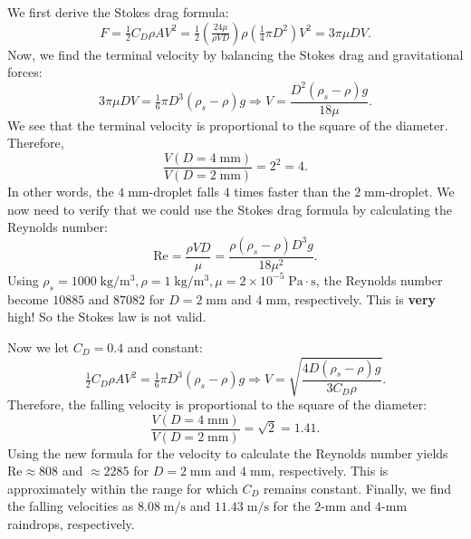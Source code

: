 \documentclass[12pt]{article}
\begin{document}
\begin{ex}
\begin{solution}
  We first derive the Stokes drag formula:
  \begin{equation*}
    F=\tfrac{1}{2}C_D\rho A V^2=\tfrac{1}{2}\left(\tfrac{24\mu}{\rho V D}\right)\rho \left(\tfrac{1}{4}\pi D^2\right) V^2=3\pi\mu DV.
  \end{equation*}
  Now, we find the terminal velocity by balancing the Stokes drag and gravitational forces:
  \begin{equation*}
    3\pi\mu DV=\tfrac{1}{6}\pi D^3(\rho_s-\rho)g\Rightarrow V=\frac{D^2(\rho_s-\rho)g}{18\mu}.
  \end{equation*}
  We see that the terminal velocity is proportional to the square of the diameter. Therefore,
  \begin{equation*}
    \frac{V(D=4\;\mathrm{mm})}{V(D=2\;\mathrm{mm})}=2^2=4.
  \end{equation*}
  In other words, the $4\;\mathrm{mm}$-droplet falls $4$ times faster than the $2\;\mathrm{mm}$-droplet. We now need to verify that we could use the Stokes drag formula by calculating the Reynolds number:
  \begin{equation*}
    \mathrm{Re}=\frac{\rho VD}{\mu}=\frac{\rho(\rho_s-\rho)D^3 g}{18\mu^2}.
  \end{equation*}
  Using $\rho_s=1000\;\mathrm{kg/m^3},\rho=1\;\mathrm{kg/m^3},\mu=2\times 10^{-5}\;\mathrm{Pa\cdot s}$, the Reynolds number become $10885$ and $87082$ for $D=2\;\mathrm{mm}$ and $4\;\mathrm{mm}$, respectively. This is \textbf{very} high! So the Stokes law is not valid.

  Now we let $C_D=0.4$ and constant:
  \begin{equation*}
    \tfrac{1}{2}C_D\rho AV^2=\tfrac{1}{6}\pi D^3(\rho_s-\rho)g\Rightarrow V=\sqrt{\frac{4D(\rho_s-\rho)g}{3C_D\rho}}.
  \end{equation*}
  Therefore, the falling velocity is proportional to the square of the diameter:
\begin{equation*}
    \frac{V(D=4\;\mathrm{mm})}{V(D=2\;\mathrm{mm})}=\sqrt{2}=1.41.
  \end{equation*}
Using the new formula for the velocity to calculate the Reynolds number yields $\mathrm{Re}\approx 808$ and $\approx 2285$ for $D=2\;\mathrm{mm}$ and $4\;\mathrm{mm}$, respectively. This is approximately within the range for which $C_D$ remains constant. Finally, we find the falling velocities as $8.08\;\mathrm{m/s}$ and $11.43\;\mathrm{m/s}$ for the $2$-$\mathrm{mm}$ and $4$-$\mathrm{mm}$ raindrops, respectively.
\end{solution}
\end{ex}
\end{document}
